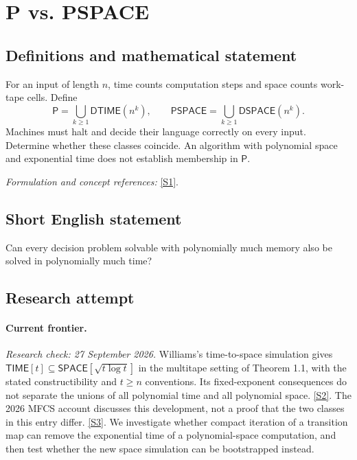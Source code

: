 \documentclass[11pt,a4paper]{article}
\newcommand{\sref}[2]{\hyperlink{source:#1:#2}{[S#2]}}
\newif\ifshowcatalogue
\newcommand{\cataloguescope}[1]{\ifshowcatalogue
 \paragraph{Exact scope in the supplied catalogue.}
 \begin{quote}\small #1\end{quote}\fi}
\begin{document}
\setcounter{section}{0}
\clearpage
\section*{\texorpdfstring{P vs. PSPACE}{P vs. PSPACE}}\label{statement}
\subsection{Definitions and mathematical statement}
For an input of length $n$, time counts computation steps and space counts work-tape cells. Define
\[
 \mathsf P=\bigcup_{k\ge1}\mathsf{DTIME}(n^k),\qquad
 \mathsf{PSPACE}=\bigcup_{k\ge1}\mathsf{DSPACE}(n^k).
\]
Machines must halt and decide their language correctly on every input. Determine whether these classes coincide. An algorithm with polynomial space and exponential time does not establish membership in $\mathsf P$.
\par\smallskip\textit{Formulation and concept references:} \sref{statement}{1}.
\cataloguescope{Determine whether P = PSPACE, that is, whether every language decidable by a deterministic Turing machine in polynomial space is decidable by a deterministic Turing machine in polynomial time.}
\subsection{Short English statement}
Can every decision problem solvable with polynomially much memory also be solved in polynomially much time?
\subsection{Research attempt}
\paragraph{Current frontier.}
\textit{Research check: 27 September 2026.}
Williams's time-to-space simulation gives
$\mathsf{TIME}[t]\subseteq\mathsf{SPACE}[\sqrt{t\log t}]$ in the
multitape setting of Theorem 1.1, with the stated constructibility and
$t\geq n$ conventions. Its fixed-exponent consequences do not separate
the unions of all polynomial time and all polynomial space.
\sref{statement}{2}. The 2026 MFCS account discusses this development, not a
proof that the two classes in this entry differ. \sref{statement}{3}.
We investigate whether compact iteration of a transition map can remove
the exponential time of a polynomial-space computation, and then test
whether the new space simulation can be bootstrapped instead.
\end{document}
